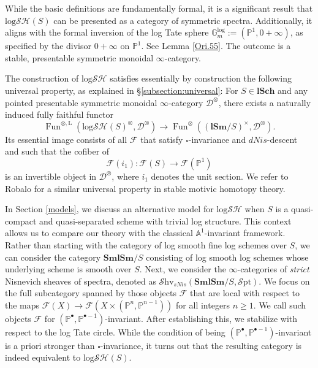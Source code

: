\documentclass[11pt, a4paper]{amsart}
\theoremstyle{definition}
\numberwithin{equation}{subsection}
\renewcommand{\P}{\mathbb{P}}
\newcommand{\A}{\mathbb{A}}
\newcommand{\lSch}{\mathbf{lSch}}
\newcommand{\lSm}{\mathbf{lSm}}
\newcommand{\SmlSm}{\mathbf{SmlSm}}
\newcommand{\cF}{\mathcal{F}}
\newcommand{\boxx}{\square}
\newcommand{\Gmm}{\mathbb{G}_m^{\mathrm{log}}}
\newcommand{\infShv}{\mathcal{S}\mathrm{hv}}
\newcommand{\infSpt}{\mathcal{S}\mathrm{pt}}
\newcommand{\Fun}{\operatorname{Fun}}
\newcommand{\infD}{\mathcal{D}}
\newcommand{\inflogSH}{\mathrm{log}\mathcal{SH}}
\begin{document}
While the basic definitions are fundamentally formal, it is a significant result that \(\inflogSH(S)\) can be presented as a category of symmetric spectra. Additionally, it aligns with the formal inversion of the log Tate sphere \(\Gmm := (\mathbb{P}^1, 0 + \infty)\), as specified by the divisor \(0 + \infty\) on \(\mathbb{P}^1\). See Lemma \ref{Ori.55}. The outcome is a stable, presentable symmetric monoidal \(\infty\)-category.







The construction of $\inflogSH$ satisfies essentially by construction the following universal property, as explained in 
\S\ref{subsection:universal}: 
For $S\in \lSch$ and any pointed presentable symmetric monoidal $\infty$-category $\infD^\otimes$, 
there exists a naturally induced fully faithful functor
\[
\Fun^{\otimes,\mathrm{L}}(\inflogSH(S)^\otimes,\infD^\otimes)
\to
\Fun^{\otimes}((\lSm/S)^\times ,\infD^\otimes).
\]
Its essential image consists of all $\cF$ that satisfy $\boxx$-invariance and $dNis$-descent and such that the 
cofiber of $$\cF(i_1)\colon\cF(S)\rightarrow\cF(\P^1)$$ is an invertible object in $\infD^\otimes$, where $i_1$
denotes the unit section.
We refer to Robalo \cite{RobaloThesispublished} for a similar universal property in stable motivic homotopy theory. 


In Section \ref{models}, we discuss an alternative model for  $\inflogSH$ when \( S \) is a quasi-compact and quasi-separated scheme with trivial log structure. This context allows us to compare our theory with the classical \(\A^1\)-invariant framework. 
Rather than starting with the category of log smooth fine log schemes over \( S \), we can consider the category \( \SmlSm/S \) consisting of log smooth log schemes whose underlying scheme is smooth over \( S \). Next, we consider the \(\infty\)-categories of \emph{strict} Nisnevich sheaves of spectra, denoted as \( \infShv_{sNis}(\SmlSm/S, \infSpt) \). We focus on the full subcategory spanned by those objects \( \cF \) that are local with respect to the maps \( \cF(X) \to \cF(X \times (\P^n, \P^{n-1})) \) for all integers $n\geq 1$. We call such objects \( \cF \) for \((\P^\bullet, \P^{\bullet-1})\)-invariant. After establishing this, we stabilize with respect to the log Tate circle.
While the condition of being \((\P^\bullet, \P^{\bullet-1})\)-invariant is a priori stronger than \(\boxx\)-invariance, it turns out that the resulting category is indeed equivalent to \( \inflogSH(S) \).
\end{document}
